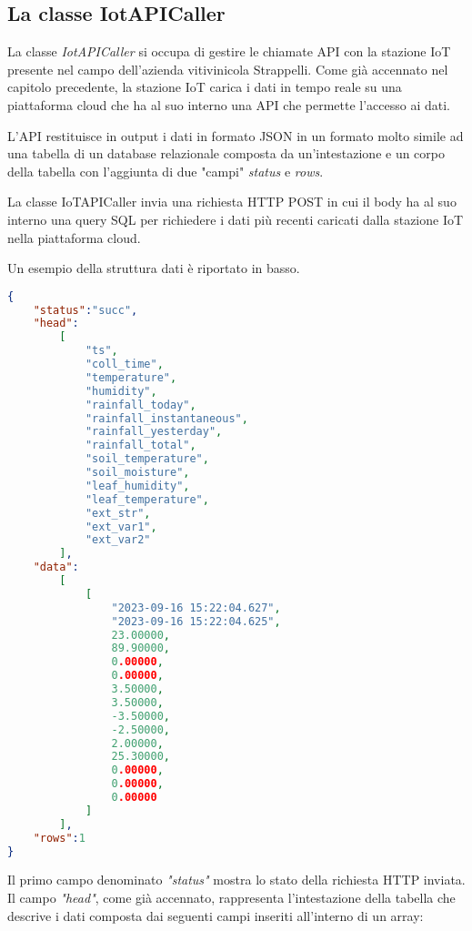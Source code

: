\subsection{La classe IotAPICaller}

La classe \textit{IotAPICaller} si occupa di gestire le chiamate API con la stazione IoT presente nel campo dell'azienda vitivinicola Strappelli. Come già accennato nel capitolo precedente, la stazione IoT carica i dati in tempo reale su una piattaforma cloud che ha al suo interno una API che permette l'accesso ai dati.

L'API restituisce in output i dati in formato JSON in un formato molto simile ad una tabella di un database relazionale composta da un'intestazione e un corpo  della tabella con l'aggiunta di due "campi" \textit{status} e \textit{rows}.

La classe IoTAPICaller invia una richiesta HTTP POST in cui il body ha al suo interno una query SQL per richiedere i dati più recenti caricati dalla stazione IoT nella piattaforma cloud.

Un esempio della struttura dati è riportato in basso. 

\begin{lstlisting}[language=json]
 {
    "status":"succ",
    "head":
        [
            "ts",
            "coll_time",
            "temperature",
            "humidity",
            "rainfall_today",
            "rainfall_instantaneous",
            "rainfall_yesterday",
            "rainfall_total",
            "soil_temperature",
            "soil_moisture",
            "leaf_humidity",
            "leaf_temperature",
            "ext_str",
            "ext_var1",
            "ext_var2"
        ],
    "data":
        [
            [
                "2023-09-16 15:22:04.627",
                "2023-09-16 15:22:04.625",
                23.00000,
                89.90000,
                0.00000,
                0.00000,
                3.50000,
                3.50000,
                -3.50000,
                -2.50000,
                2.00000,
                25.30000,
                0.00000,
                0.00000,
                0.00000
            ]
        ],
    "rows":1
}
\end{lstlisting}

Il primo campo denominato \textit{"status"} mostra lo stato della richiesta HTTP inviata.
Il campo \textit{"head"}, come già accennato, rappresenta l'intestazione della tabella che descrive i dati composta dai seguenti campi inseriti all'interno di un array:

